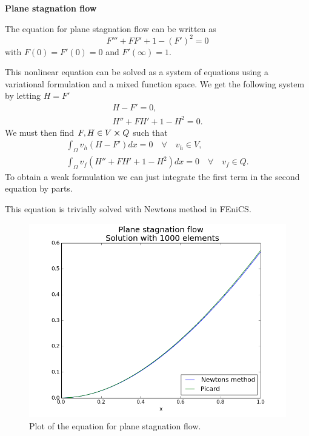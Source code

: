 \documentclass[11pt,a4paper,english]{article}
\numberwithin{equation}{section}
\begin{document}
\textbf{Plane stagnation flow}

The equation for plane stagnation flow can be written as
\begin{equation}
F''' + FF' + 1 - (F')^2 = 0
\end{equation}
with $F(0) = F'(0) = 0$ and $F'(\infty)=1$.

This nonlinear equation can be solved as a system of equations using a variational formulation and a mixed function space. We get the following system by letting $H=F'$
\begin{align}
H - F' = 0, \\
H'' + FH' + 1 - H^2 = 0.
\end{align}
We must then find $F,H \in V \cross Q$ such that 
\begin{align*}
\int_\Omega v_h(H - F') dx =0 \quad \forall \quad v_h \in V, \\
\int_\Omega v_f(H'' + FH' + 1 - H^2) dx = 0 \quad \forall \quad  v_f \in Q.
\end{align*}
To obtain a weak formulation we can just integrate the first term in the second equation by parts. 

This equation is trivially solved with Newtons method in FEniCS.

\begin{figure}[h!]
\begin{center}
  \includegraphics[scale=0.4]{plane_stag.png}
  \end{center}
  \caption{Plot of the equation for plane stagnation flow.}
  \label{fig:stokes_square}
\end{figure}
\end{document}

